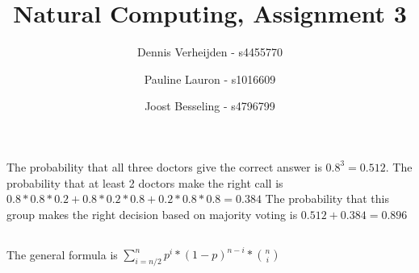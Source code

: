 \documentclass[11pt]{article}
\title{Natural Computing, Assignment 3}
\author{Dennis Verheijden - s4455770 \and Pauline Lauron - s1016609 \and Joost Besseling - s4796799}
\begin{document}
\maketitle

\section{}
\subsection{}
The probability that all three doctors give the correct answer is $ 0.8^3 = 0.512$. 
\newline The probability that at least 2 doctors make the right call is $0.8*0.8*0.2 + 0.8*0.2*0.8 + 0.2*0.8*0.8 = 0.384$
\newline The probability that this group makes the right decision based on majority voting is $0.512 + 0.384 = 0.896$

\subsection{}
The general formula is $\displaystyle\sum_{i = n/2}^{n} p^i*(1-p)^{n-i} * \binom{n}{i}$
\end{document}
